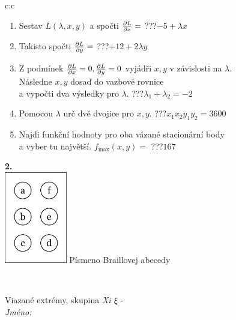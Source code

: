 \documentclass[10pt]{report}
\begin{document}
\begin{tabular}{c:c}
\begin{minipage}[c][104.5mm][t]{0.5\linewidth}
\begin{center}
\begin{minipage}{0.79\linewidth}
\begin{center}
\begin{varwidth}{\linewidth}
\begin{enumerate}
\item Sestav $L(\lambda,x,y)$ a spočti $\pdv{L}{x}=$\quad \dotfill\; ???\;\dotfill \quad $-5+\lambda x$
\item Takisto spočti $\pdv{L}{y}=$\quad \dotfill\; ???\;\dotfill \quad $+12+2\lambda y$
\item Z podmínek $\pdv{L}{x}=0 , \pdv{L}{y}=0$ vyjádři $x,y$ v závislosti na $\lambda$.\\ \phantom{xxxxxx}Následne $x,y$ dosaď do vazbové rovnice\\ \phantom{xxxxxx}a vypočti dva výsledky pro $\lambda$.\quad \dotfill\; ???\;\dotfill \quad $\lambda_1+\lambda_2=-2$
\item Pomocou $\lambda$ urč dvě dvojice pro $x,y$.\quad \dotfill\; ???\;\dotfill \quad $x_1 x_2 y_1 y_2=3600$
\item Najdi funkční hodnoty pro oba vázané stacionární body\\ \phantom{xxxxxx}a vyber tu najvětší. $f_{\text{max}}(x,y)=$\quad \dotfill\; ???\;\dotfill \quad $167$
\end{enumerate}
\end{varwidth}
\end{center}
\end{minipage}
\begin{minipage}{0.20\linewidth}
\begin{center}
{\Huge\bfseries 2.} \\[2mm]
\includegraphics[height=40mm]{../images/braille.png}
{\small Písmeno Braillovej abecedy}
\end{center}
\end{minipage}
\end{center}
\end{minipage}
\\ \hdashline
\begin{minipage}[c][104.5mm][t]{0.5\linewidth}
\begin{center}
\vspace{7mm}
{\huge Viazané extrémy, skupina \textit{Xi $\xi$} -}\\[5mm]
\textit{Jméno:}\phantom{xxxxxxxxxxxxxxxxxxxxxxxxxxxxxxxxxxxxxxxxxxxxxxxxxxxxxxxxxxxxxxxxx}\\[5mm]

\end{center}
\end{minipage}
\end{tabular}
\end{document}
